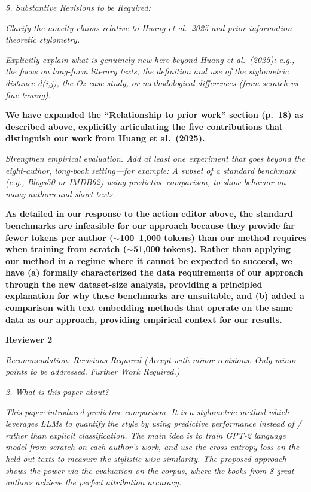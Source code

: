 \documentclass[11pt]{article}
\newcommand{\pref}[1]{p.~#1}
\begin{document}
\textit{5. Substantive Revisions to be Required:}

\textit{Clarify the novelty claims relative to Huang et al.\ 2025 and prior information-theoretic stylometry.}

\textit{Explicitly explain what is genuinely new here beyond Huang et al.\ (2025): e.g., the focus on long-form literary texts, the definition and use of the stylometric distance d(i,j), the Oz case study, or methodological differences (from-scratch vs fine-tuning).}

\textbf{We have expanded the ``Relationship to prior work'' section (\pref{18})
as described above, explicitly articulating the five contributions that
distinguish our work from Huang et al.\ (2025).}

\textit{Strengthen empirical evaluation. Add at least one experiment that goes
beyond the eight-author, long-book setting---for example: A subset of a
standard benchmark (e.g., Blogs50 or IMDB62) using predictive comparison, to
show behavior on many authors and short texts.}

\textbf{As detailed in our response to the action editor above, the standard
benchmarks are infeasible for our approach because they provide far fewer
tokens per author ($\sim$100--1,000 tokens) than our method requires when
training from scratch ($\sim$51,000 tokens). Rather than applying our method in
a regime where it cannot be expected to succeed, we have (a) formally
characterized the data requirements of our approach through the new
dataset-size analysis, providing a principled explanation for why these
benchmarks are unsuitable, and (b) added a comparison with text embedding
methods that operate on the same data as our approach, providing empirical
context for our results.}

\newpage


\textbf{\large Reviewer 2}

\textit{Recommendation: Revisions Required (Accept with minor revisions: Only
minor points to be addressed. Further Work Required.)}

\textit{2. What is this paper about?}

\textit{This paper introduced predictive comparison. It is a stylometric method
which leverages LLMs to quantify the style by using predictive performance
instead of / rather than explicit classification. The main idea is to train
GPT-2 language model from scratch on each author's work, and use the
cross-entropy loss on the held-out texts to measure the stylistic wise
similarity. The proposed approach shows the power via the evaluation on the
corpus, where the books from 8 great authors achieve the perfect attribution
accuracy.}
\end{document}
